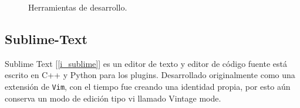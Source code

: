 \documentclass[12pt]{book} %
\begin{document}
		\begin{figure}[hbt]
			\centering
			\caption{Herramientas de desarrollo. \label{f-lenete-uml}}
		\end{figure}	
	\subsection{Sublime-Text \label{subl}}
		Sublime Text [\ref{i_sublime}] es un editor de texto y editor de código fuente está escrito en C++ y Python para los plugins. Desarrollado
		originalmente como una extensión de \texttt{Vim}, con el tiempo fue creando una identidad propia, por esto aún conserva un modo 
		de edición tipo vi llamado Vintage mode.\\
		
\end{document}
